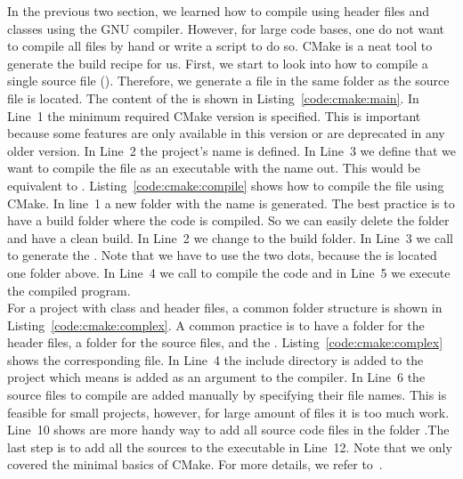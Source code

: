 In the previous two section, we learned how to compile using header files and classes using the GNU compiler. However, for large code bases, one do not want to compile all files by hand or write a script to do so. CMake is a neat tool to generate the build recipe for us. First, we start to look into how to compile a single source file (). Therefore, we generate a  file in the same folder as the source file is located. The content of the  is shown in Listing~\ref{code:cmake:main}. In Line~1 the minimum required CMake version is specified. This is important because some features are only available in this version or are deprecated in any older version. In Line~2 the project's name is defined. In Line~3 we define that we want to compile the file  as an executable with the name out. This would be equivalent to . Listing~\ref{code:cmake:compile} shows how to compile the  file using CMake. In line~1 a new folder with the name  is generated. The best practice is to have a build folder where the code is compiled. So we can easily delete the folder and have a clean build. In Line~2 we change to the build folder. In Line~3 we call  to generate the . Note that we have to use the two dots, because the  is located one folder above. In Line~4 we call  to compile the code and in Line~5 we execute the compiled program. \\

For a project with class and header files, a common folder structure is shown in Listing~\ref{code:cmake:complex}. A common practice is to have a folder  for the header files, a folder  for the source files, and the . Listing~\ref{code:cmake:complex} shows the corresponding  file. In Line~4 the include directory is added to the project which means  is added as an argument to the compiler. In Line~6 the source files to compile are added manually by specifying their file names. This is feasible for small projects, however, for large amount of files it is too much work. Line~10 shows are more handy way to add all source code files in the folder .The last step is to add all the sources to the executable in Line~12. Note that we only covered the minimal basics of CMake. For more details, we refer to~\cite{cmake}.        


